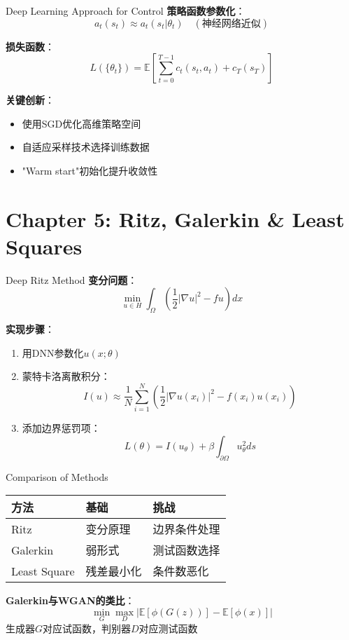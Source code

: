 \documentclass[aspectratio=169]{beamer}
\begin{document}
	\iffalse
	\begin{frame}{Deep Learning Approach for Control}
		\textbf{策略函数参数化}：
		\[
		a_t(s_t) \approx a_t(s_t|\theta_t) \quad (\text{神经网络近似})
		\]

		\textbf{损失函数}：
		\[
		L(\{\theta_t\}) = \mathbb{E}\left[ \sum_{t=0}^{T-1} c_t(s_t,a_t) + c_T(s_T) \right]
		\]

		\textbf{关键创新}：
		\begin{itemize}
			\item 使用SGD优化高维策略空间
			\item 自适应采样技术选择训练数据
			\item "Warm start"初始化提升收敛性
		\end{itemize}
	\end{frame}

	\section{Chapter 5: Ritz, Galerkin \& Least Squares}
	\begin{frame}{Deep Ritz Method}
		\textbf{变分问题}：
		\[
		\min_{u \in H} \int_\Omega \left( \frac{1}{2}|\nabla u|^2 - fu \right) dx
		\]

		\textbf{实现步骤}：
		\begin{enumerate}
			\item 用DNN参数化$u(x;\theta)$
			\item 蒙特卡洛离散积分：
			\[
			I(u) \approx \frac{1}{N}\sum_{i=1}^N \left( \frac{1}{2}|\nabla u(x_i)|^2 - f(x_i)u(x_i) \right)
			\]
			\item 添加边界惩罚项：
			\[
			L(\theta) = I(u_\theta) + \beta \int_{\partial\Omega} u_\theta^2 ds
			\]
		\end{enumerate}
	\end{frame}

	\begin{frame}{Comparison of Methods}
		\begin{table}[ht]
		\centering
		\begin{tabular}{|l|l|l|}
		\hline
		\textbf{方法} & \textbf{基础} & \textbf{挑战} \\
		\hline
		Ritz & 变分原理 & 边界条件处理 \\
		Galerkin & 弱形式 & 测试函数选择 \\
		Least Square & 残差最小化 & 条件数恶化 \\
		\hline
		\end{tabular}
		\end{table}

		\textbf{Galerkin与WGAN的类比}：
		\[
		\min_G \max_D \left| \mathbb{E}[\phi(G(z))] - \mathbb{E}[\phi(x)] \right|
		\]
		生成器$G$对应试函数，判别器$D$对应测试函数
	\end{frame}
\end{document}
